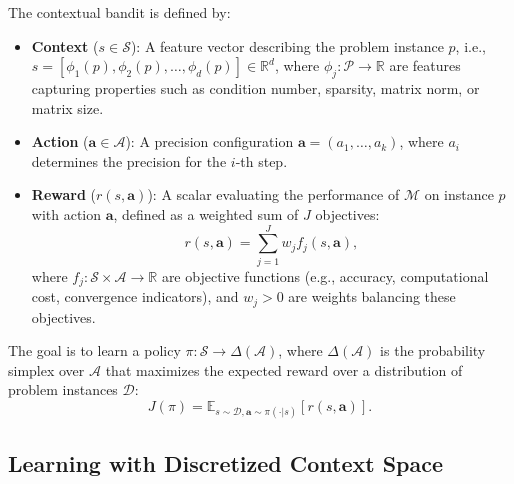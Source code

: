 \documentclass[Afour,sageh,times]{sagej}
\theoremstyle{plain}
\theoremstyle{definition}
\begin{document}
The contextual bandit is defined by:
\begin{itemize}
    \item \textbf{Context} ($s \in \mathcal{S}$): A feature vector describing the problem instance $p$, i.e., $s = [\phi_1(p), \phi_2(p), \ldots, \phi_d(p)] \in \mathbb{R}^d$, where $\phi_j: \mathcal{P} \to \mathbb{R}$ are features capturing properties such as condition number, sparsity, matrix norm, or matrix size.
    \item \textbf{Action} ($\mathbf{a} \in \mathcal{A}$): A precision configuration $\mathbf{a} = (a_1, \ldots, a_k)$, where $a_i$ determines the precision for the $i$-th step.
    \item \textbf{Reward} ($r(s, \mathbf{a})$): A scalar evaluating the performance of $\mathcal{M}$ on instance $p$ with action $\mathbf{a}$, defined as a weighted sum of $J$ objectives:
    \begin{equation}
    r(s, \mathbf{a}) = \sum_{j=1}^J w_j f_j(s, \mathbf{a}),
    \end{equation}
    where $f_j: \mathcal{S} \times \mathcal{A} \to \mathbb{R}$ are objective functions (e.g., accuracy, computational cost, convergence indicators), and $w_j > 0$ are weights balancing these objectives.
\end{itemize}

The goal is to learn a policy $\pi: \mathcal{S} \to \Delta(\mathcal{A})$, where $\Delta(\mathcal{A})$ is the probability simplex over $\mathcal{A}$ that maximizes the expected reward over a distribution of problem instances $\mathcal{D}$:
\begin{equation*}
J(\pi) = \mathbb{E}_{s \sim \mathcal{D}, \mathbf{a} \sim \pi(\cdot | s)} [ r(s, \mathbf{a}) ].
\end{equation*}



\subsection{Learning with Discretized Context Space}
\label{subsec:bandit_learning}
\end{document}
